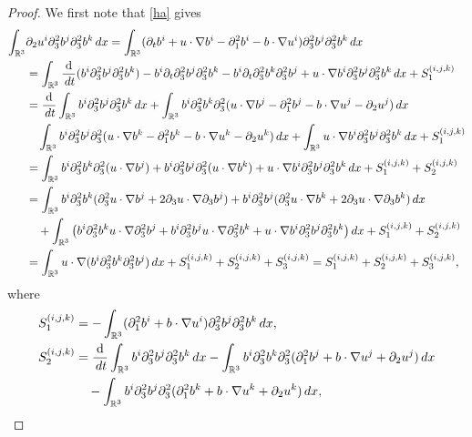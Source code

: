 \documentclass[10pt,a4paper]{amsart}
\newcommand{\R}{\mathbb{R}}
\newcommand{\dt}{\,{\rm d}t}
\newcommand{\dx}{\,{\rm d}x}
\begin{document}
\begin{proof} We first note that \eqref{ha} gives
	\begin{align*}
		\int_{\R^3}&\partial_2u^i\partial_3^2b^j\partial_3^2b^k\dx=\int_{\R^3}({\partial_t}b^i+u\cdot\nabla{b}^i-\partial_1^2b^i -b\cdot\nabla{u}^i)\partial_3^2b^j\partial_3^2b^k\dx \\
		&=\int_{\R^3}\frac{\mathrm{d}}{\dt}(b^i\partial_3^2b^j\partial_3^2b^k)-b^i\partial_t\partial_3^2b^j\partial_3^2b^k-b^i\partial_t\partial_3^2b^k\partial_3^2b^j+u\cdot\nabla b^i\partial_3^2b^j\partial_3^2b^k\dx+S^{(i,j,k)}_1\\
		&=\frac{\mathrm{d}}{\dt}\int_{\R^3} b^i\partial_3^2b^j\partial_3^2b^k\dx+\int_{\R^3} b^i\partial_3^2b^k\partial_3^2(u\cdot\nabla{b}^j-\partial_1^2b^j -b\cdot\nabla{u}^j-\partial_2u^j)\dx\\
		&\quad\int_{\R^3} b^i\partial_3^2b^j\partial_3^2(u\cdot\nabla{b}^k-\partial_1^2b^k -b\cdot\nabla{u}^k-\partial_2u^k)\dx+\int_{\R^3} u\cdot\nabla b^i\partial_3^2b^j\partial_3^2b^k\dx+S^{(i,j,k)}_1\\
		&=\int_{\R^3} b^i\partial_3^2b^k\partial_3^2(u\cdot\nabla{b}^j)+b^i\partial_3^2b^j\partial_3^2(u\cdot\nabla{b}^k)+u\cdot\nabla b^i\partial_3^2b^j\partial_3^2b^k\dx+S^{(i,j,k)}_1+S^{(i,j,k)}_2\\
		&=\int_{\R^3} b^i\partial_3^2b^k(\partial_3^2u\cdot\nabla{b}^j+2\partial_3u\cdot\nabla\partial_3{b}^j)+b^i\partial_3^2b^j(\partial_3^2u\cdot\nabla{b}^k+2\partial_3u\cdot\nabla\partial_3{b}^k)\dx\\
		&\quad+\int_{\R^3} \big(b^i\partial_3^2b^ku\cdot\nabla\partial_3^2{b}^j+
		b^i\partial_3^2b^ju\cdot\nabla\partial_3^2{b}^k+u\cdot\nabla b^i\partial_3^2b^j\partial_3^2b^k\big)\dx+S^{(i,j,k)}_1+S^{(i,j,k)}_2\\
		&=\int_{\R^3} u\cdot \nabla(b^i\partial_3^2b^k\partial_3^2{b}^j)\dx+S^{(i,j,k)}_1+S^{(i,j,k)}_2+S^{(i,j,k)}_3=S^{(i,j,k)}_1+S^{(i,j,k)}_2+S^{(i,j,k)}_3,
	\end{align*}
	where
	\begin{align*}
		S^{(i,j,k)}_1&=-\int_{\R^3} (\partial_1^2b^i +b\cdot\nabla{u}^i)\partial_3^2b^j\partial_3^2b^k\dx,\\
		S^{(i,j,k)}_2&=\frac{\mathrm{d}}{\dt}\int_{\R^3} b^i\partial_3^2b^j\partial_3^2b^k\dx-\int_{\R^3} b^i\partial_3^2b^k\partial_3^2(\partial_1^2b^j +b\cdot\nabla{u}^j+\partial_2u^j)\dx\\
		&\quad-\int_{\R^3} b^i\partial_3^2b^j\partial_3^2(\partial_1^2b^k +b\cdot\nabla{u}^k+\partial_2u^k)\dx,\\

\end{align*}
\end{proof}
\end{document}
